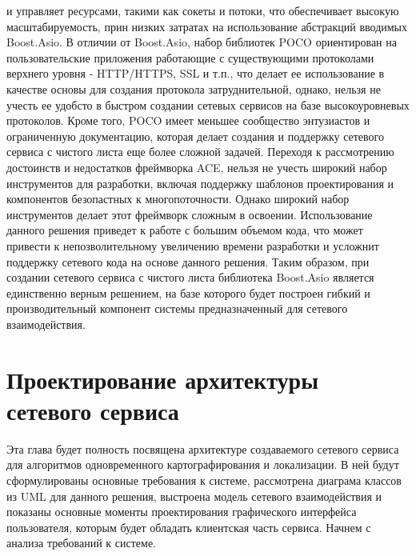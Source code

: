 \documentclass[a4paper, 14pt]{extreport}
\begin{document}
и управляет ресурсами, такими как сокеты и потоки, что обеспечивает высокую масштабируемость, прин низких затратах на использование 
абстракций вводимых Boost.Asio. В отличии от Boost.Asio, набор библиотек POCO ориентирован на пользовательские приложения работающие с 
существующими протоколами верхнего уровня - HTTP/HTTPS, SSL и т.п., что делает ее использование в качестве основы для создания 
протокола затруднительной, однако, нельзя не учесть ее удобсто в быстром создании сетевых сервисов на базе высокоуровневых протоколов.
Кроме того, POCO имеет меньшее сообщество энтузиастов и ограниченную документацию, которая делает создания и поддержку сетевого сервиса
с чистого листа еще более сложной задачей. Переходя к рассмотрению достоинств и недостатков фреймворка ACE, нельзя не учесть широкий 
набор инструментов для разработки, включая поддержку шаблонов проектирования\cite{patternBook}\cite{patternArt1} и компонентов безопастных к 
многопоточности\cite{concurrBook}\cite{concurrArt1}. Однако 
широкий набор инструментов делает этот фреймворк сложным в освоении. Использование данного решения приведет к работе с большим объемом
кода, что может привести к непозволительному увеличению времени разработки и усложнит поддержку сетевого кода на основе данного решения.
Таким образом, при создании сетевого сервиса с чистого листа библиотека Boost.Asio является единственно верным решением, на базе которого
будет построен гибкий и производительный компонент системы предназначенный для сетевого взаимодействия.
\chapter{Проектирование архитектуры сетевого сервиса}
\par Эта глава будет полность посвящена архитектуре создаваемого сетевого сервиса для алгоритмов одновременного картографирования и 
локализации. В ней будут сформулированы основные требования к системе, рассмотрена диаграма классов из UML\cite{umlArt} для данного решения, выстроена
модель сетевого взаимодействия и показаны основные моменты проектирования графического интерфейса пользователя, которым будет обладать 
клиентская часть сервиса. Начнем с анализа требований к системе.
\end{document}
